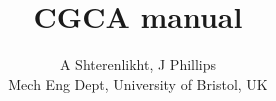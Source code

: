 \documentclass[a4paper,12pt]{article}
\title{CGCA manual}
\author{A Shterenlikht, J Phillips \\
Mech Eng Dept, University of Bristol, UK}
\begin{document}
\newcommand{\tenrtwo}[1]{\mathbold{#1}}
\newcommand{\tenrfour}[1]{\mathcal{#1}}

\maketitle

\tableofcontents













\end{document}
